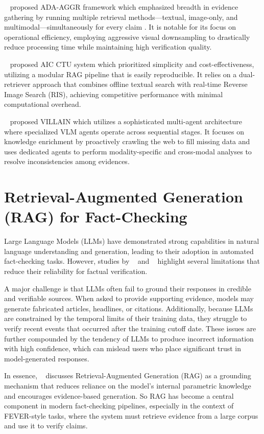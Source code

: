 ~\citet{Upravitelev2026Mar} proposed ADA-AGGR framework which emphasized breadth in evidence gathering by running multiple retrieval methods—textual, image-only, and multimodal—simultaneously for every claim
. It is notable for its focus on operational efficiency, employing aggressive visual downsampling to drastically reduce processing time while maintaining high verification quality.

~\citet{Ullrich2026Mar} proposed AIC CTU system which prioritized simplicity and cost-effectiveness, utilizing a modular RAG pipeline that is easily reproducible. It relies on a dual-retriever approach that combines offline textual search with real-time Reverse Image Search (RIS), achieving competitive performance with minimal computational overhead.

~\citet{Jung2026Mar} proposed VILLAIN which utilizes a sophisticated multi-agent architecture where specialized VLM agents operate across sequential stages. It focuses on knowledge enrichment by proactively crawling the web to fill missing data and uses dedicated agents to perform modality-specific and cross-modal analyses to resolve inconsistencies among evidences.

\section{Retrieval-Augmented Generation (RAG) for Fact-Checking}

Large Language Models (LLMs) have demonstrated strong capabilities in natural language understanding and generation, leading to their adoption in automated fact-checking tasks. However, studies by ~\citet{Proma2025Feb} and ~\citet{Lewis2020May} highlight several limitations that reduce their reliability for factual verification.

A major challenge is that LLMs often fail to ground their responses in credible and verifiable sources. When asked to provide supporting evidence, models may generate fabricated articles, headlines, or citations. Additionally, because LLMs are constrained by the temporal limits of their training data, they struggle to verify recent events that occurred after the training cutoff date. These issues are further compounded by the tendency of LLMs to produce incorrect information with high confidence, which can mislead users who place significant trust in model-generated responses.

In essence, ~\citet{Lewis2020May} discusses Retrieval-Augmented Generation (RAG) as a grounding mechanism that reduces reliance on the model’s internal parametric knowledge and encourages evidence-based generation. So RAG has become a central component in modern fact-checking pipelines, especially in the context of FEVER-style tasks, where the system must retrieve evidence from a large corpus and use it to verify claims.

